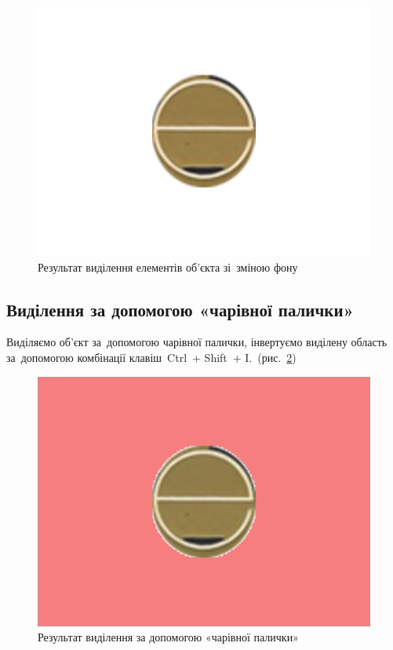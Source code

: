 \documentclass[
	a4paper,
	oneside,
	BCOR = 10mm,
	DIV = 12,
	12pt,
	headings = normal,
]{scrartcl}
\newcommand{\key}[1]{\textsf{#1}}
\begin{document}
			\begin{figure}[!htbp]
				\centering
				\includegraphics[height = 4\baselineskip]{./../01-solution/y03s01-multimedia-lab-02-02-p03.png}
				\caption{Результат виділення елементів об'єкта зі~зміною фону}
				\label{fig:03-bg-change-res}
			\end{figure}

		\subsection{Виділення за допомогою «чарівної палички»}
			Виділяємо об'єкт за~допомогою чарівної палички, інвертуємо виділену область за~допомогою комбінації клавіш~\key{\textenglish{Ctrl}}~+ \key{\textenglish{Shift}}~+ \key{\textenglish{I}}.~(рис.~\ref{fig:04-magic-wand-res})

			\begin{figure}[!htbp]
				\centering
				\includegraphics[height = 4\baselineskip]{./../01-solution/y03s01-multimedia-lab-02-02-p04-v03.png}
				\caption{Результат виділення за допомогою «чарівної палички»}
				\label{fig:04-magic-wand-res}
			\end{figure}
\end{document}
